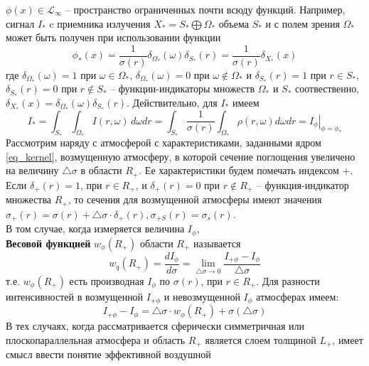 \documentclass[a4paper,14pt]{article}
\theoremstyle{plain}
\theoremstyle{definition}
\theoremstyle{remark}
\newcommand{\nl}{\\ \indent}
\begin{document}
$\phi(x) \in \mathcal{L}_{\infty}$ -- пространство ограниченных
почти всюду функций. Например, сигнал $I_*$ c приемника 
излучения $X_* = S_* \bigoplus \Omega_*$ объема $S_*$ и с полем
зрения $\Omega_*$ может быть получен при использовании функции
\begin{equation}
\phi_*(x) =
\dfrac{1}{\sigma (r)}
\delta_{\Omega_*}(\omega)
\delta_{S_*}(r) =
\dfrac{1}{\sigma (r)}
\delta_{X_*}(x)
\end{equation}
где $\delta_{\Omega_*}(\omega) = 1$ при 
$\omega \in \Omega_*$, $\delta_{\Omega_*}(\omega) = 0$
при $\omega \notin \Omega_*$ и
$\delta_{S_*}(r) = 1$ при $r \in S_*$,
$\delta_{S_*}(r) = 0$ при $r \notin S_*$ --
функции-индикаторы множеств $\Omega_*$ и $S_*$ соотвественно,
$\delta_{X_*}(x)=\delta_{\Omega_*}(\omega) \delta_{S_*}(r)$.
Действительно, для $I_*$ имеем
\begin{equation}
I_* = \int_{S_*} \int_{\Omega_*}
I(r, \omega) \, d\omega dr =
\int_{S_*} \dfrac{1}{\sigma (r)}
\int_{\Omega_*} \rho(r, \omega)
d \omega dr =
\left. I_{\phi} \right|_{\phi = \phi_*}
\end{equation}
Рассмотрим наряду с атмосферой с характеристиками, 
заданными ядром \eqref{eq_kernel}, возмущенную атмосферу, 
в которой сечение поглощения увеличено на величину 
$\triangle\sigma$ в области $R_+$. 
Ее характеристики будем помечать индексом $+$. 
Если $\delta_+(r)=1$, при $r \in R_+$, и 
$\delta_+(r)=0$ при $r \notin R_+$ -- 
функция-индикатор множества $R_+$, 
то сечения для возмущенной атмосферы имеют значения 
$\sigma_+(r) = \sigma(r) 
+ \triangle \sigma \cdot \delta_+(r)
, \sigma_{+S}(r) = \sigma_s(r)$.
\nl
В том случае, когда измеряется величина $I_\phi$,\\
\textbf{Весовой функцией} $w_\phi(R_+)$ области $R_+$ называется
\begin{equation}
w_q(R_+)=
\dfrac{dI_\phi}{d \sigma} =
\lim_{\triangle \sigma \rightarrow 0}
\dfrac{I_{+ \phi} - I_\phi}{\triangle \sigma}
\label{eq_weight_1}
\end{equation}
т.е. $w_\phi(R_+)$ есть производная $I_\phi$ по 
$\sigma(r)$, при $r \in R_+$. 
Для разности интенсивностей в возмущенной $I_{+ \phi}$ и
невозмущенной $I_{\phi}$ атмосферах имеем:
\begin{equation}
I_{+ \phi} - I_\phi = 
\triangle \sigma \cdot w_\phi (R_+) +
\sigma(\triangle \sigma)
\end{equation} 
В тех случаях, когда рассматривается сферически симметричная или
плоскопараллельная атмосфера и область $R_+$ является слоем
толщиной $L_+$, имеет смысл ввести понятие эффективной воздушной
\end{document}
